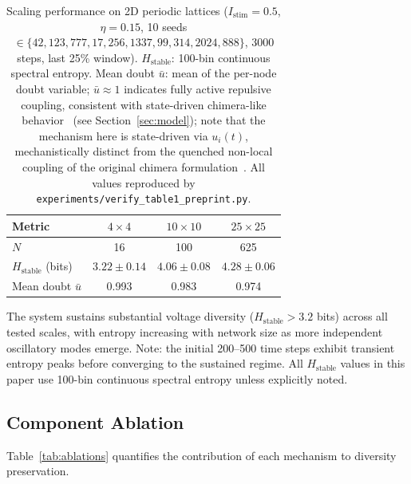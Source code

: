 \documentclass[11pt]{article}
\begin{document}
\begin{table}[ht]
\centering
\caption{Scaling performance on 2D periodic lattices ($I_\mathrm{stim}=0.5$, $\eta = 0.15$, 10 seeds $\in\{42,123,777,17,256,1337,99,314,2024,888\}$, 3000 steps, last 25\% window). $H_{\text{stable}}$: 100-bin continuous spectral entropy. Mean doubt $\bar{u}$: mean of the per-node doubt variable; $\bar{u} \approx 1$ indicates fully active repulsive coupling, consistent with state-driven chimera-like behavior~\cite{abrams2004} (see Section~\ref{sec:model}); note that the mechanism here is state-driven via $u_i(t)$, mechanistically distinct from the quenched non-local coupling of the original chimera formulation~\cite{abrams2004}. All values reproduced by \texttt{experiments/verify\_table1\_preprint.py}.}
\label{tab:scaling}
\begin{tabular}{lccc}
\toprule
\textbf{Metric} & \textbf{$4 \times 4$} & \textbf{$10 \times 10$} & \textbf{$25 \times 25$} \\
\midrule
$N$                          & 16   & 100   & 625   \\
$H_{\text{stable}}$ (bits)   & $3.22 \pm 0.14$ & $4.06 \pm 0.08$  & $4.28 \pm 0.06$  \\
Mean doubt $\bar{u}$          & 0.993 & 0.983 & 0.974 \\
\bottomrule
\end{tabular}
\end{table}

The system sustains substantial voltage diversity ($H_{\text{stable}} > 3.2$ bits) across all tested scales, with entropy increasing with network size as more independent oscillatory modes emerge. Note: the initial 200--500 time steps exhibit transient entropy peaks before converging to the sustained regime. All $H_{\text{stable}}$ values in this paper use 100-bin continuous spectral entropy unless explicitly noted.

\subsection{Component Ablation}

Table~\ref{tab:ablations} quantifies the contribution of each mechanism to diversity preservation.
\end{document}
